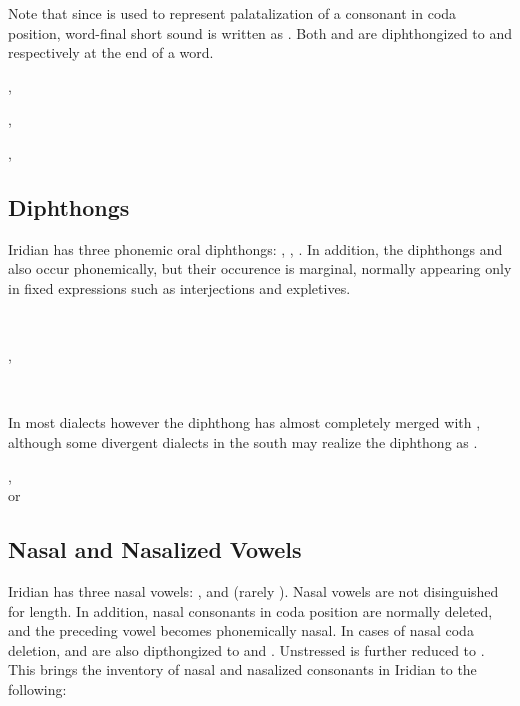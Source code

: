 Note that since  is used to represent palatalization of a consonant in coda position, word-final short  sound is written as . Both  and  are diphthongized to  and  respectively at the end of a word.

\ex
{}, \\
\xe

\ex
{}, \\
\xe

\ex
{}, \\
\xe

\subsection{Diphthongs}
Iridian has three phonemic oral diphthongs:  ,  \nt{\dte},  \nt{\dto}. In addition, the diphthongs   and   also occur phonemically, but their occurence is marginal, normally appearing only in fixed expressions such as interjections and expletives.

\ex
{} \\
\xe

\ex
{}, \\
\xe

\ex
{} \\
\xe

In most dialects however the diphthong \nt{\dte} has almost completely merged with  , although some divergent dialects in the south may realize the diphthong as .


\ex
{}, \\
 or 
\xe

\subsection{Nasal and Nasalized Vowels}
Iridian has three nasal vowels:  ,   and   (rarely ). Nasal vowels are not disinguished for length. In addition, nasal consonants in coda position are normally deleted, and the preceding vowel becomes phonemically nasal. In cases of nasal coda deletion,   and   are also dipthongized to  and . Unstressed  is further reduced to . This brings the inventory of nasal and nasalized consonants in Iridian to the following: 

